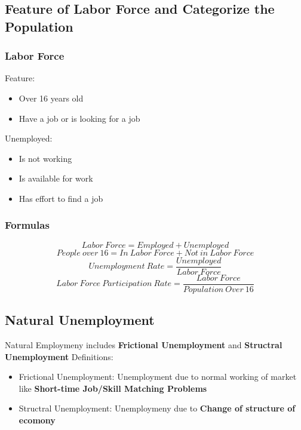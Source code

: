 \documentclass[11pt]{article}
\begin{document}
\subsection{Feature of Labor Force and Categorize the Population}
    \subsubsection{Labor Force}
        Feature:
            \begin{itemize}
                \item Over 16 years old
                \item Have a job or is looking for a job
            \end{itemize}
        Unemployed:
            \begin{itemize}
                \item Is not working
                \item Is available for work
                \item Has effort to find a job
            \end{itemize}
    \subsubsection{Formulas}
    \begin{equation}
        Labor\ Force = Employed + Unemployed
    \end{equation}
    \begin{equation}
        People\ over\ 16 = In\ Labor\ Force + Not\ in\ Labor\ Force 
    \end{equation}
    \begin{equation}
        Unemployment\ Rate = \frac {Unemployed}{Labor\ Force}
    \end{equation}
    \begin{equation}
        Labor\ Force\ Participation\ Rate = \frac{Labor\ Force}{Population\ Over\ 16}
    \end{equation}
\subsection{Natural Unemployment}
    Natural Employmeny includes \textbf{Frictional Unemployment} and \textbf{Structral Unemployment}
    Definitions:
        \begin{itemize}
            \item Frictional Unemployment: Unemployment due to normal working of market like \textbf{Short-time Job/Skill Matching Problems}
            \item Structral Unemployment: Unemploymeny due to \textbf{Change of structure of ecomony}
        \end{itemize}
\end{document}
